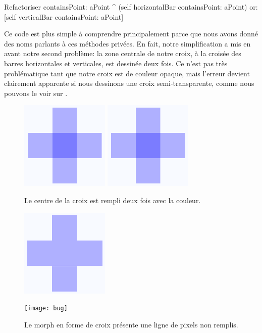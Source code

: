 \documentclass[a4paper,10pt,twoside]{book}
\begin{document}
\begin{method}{Refactoriser }
containsPoint: aPoint
	^ (self horizontalBar containsPoint: aPoint)
		or: [self verticalBar containsPoint: aPoint]
\end{method}

Ce code est plus simple à comprendre principalement parce que nous
avons donné des noms parlants à ces méthodes privées. En fait,
notre simplification a mis en avant notre second problème: 
la zone centrale de notre croix, à la croisée des barres
horizontales et verticales, est dessinée deux fois. Ce n'est pas
très problématique tant que notre croix est de couleur opaque,
mais l'erreur devient clairement apparente si nous dessinons une croix
semi-transparente, comme nous pouvons le voir sur .

\begin{figure}[t]
\begin{minipage}{0.48\textwidth}
	\ifluluelse
		{\centerline{\includegraphics[scale=0.6]{overdrawBug}}}
		{\centerline{\includegraphics{overdrawBug}}}
	\caption{Le centre de la croix est rempli deux fois avec la
      couleur.	}
\end{minipage}
\hfill
\begin{minipage}{0.48\textwidth}
	\ifluluelse
		{\centerline{\includegraphics[scale=0.6]{hairlineBug}}}
		{\centerline{\texttt{[image: bug]}}}
	\caption{Le morph en forme de croix présente une ligne de pixels
      non remplis.	}
\end{minipage}
\end{figure}
\end{document}
